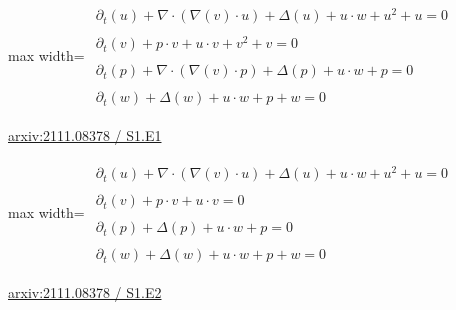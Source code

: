 \documentclass[10pt,a4paper]{article}
\begin{document}
\begin{minipage}{\linewidth}
\begin{center}\begin{adjustbox}{max width=\linewidth}$\displaystyle\begin{gathered}\begin{gathered}\partial_{t}(u)+\nabla\cdot(\nabla(v)\cdot u)+\Delta(u)+u\cdot w+u^{2}+u=0\end{gathered}\\[5pt]\begin{gathered}\partial_{t}(v)+p\cdot v+u\cdot v+v^{2}+v=0\end{gathered}\\[5pt]\begin{gathered}\partial_{t}(p)+\nabla\cdot(\nabla(v)\cdot p)+\Delta(p)+u\cdot w+p=0\end{gathered}\\[5pt]\begin{gathered}\partial_{t}(w)+\Delta(w)+u\cdot w+p+w=0\end{gathered}\end{gathered}$\end{adjustbox}\end{center}
{\small \href{https://arxiv.org/html/2111.08378#S1.E1}{arxiv:2111.08378 / S1.E1}}\par
\end{minipage}\par\vspace{7mm}

\begin{minipage}{\linewidth}
\begin{center}\begin{adjustbox}{max width=\linewidth}$\displaystyle\begin{gathered}\begin{gathered}\partial_{t}(u)+\nabla\cdot(\nabla(v)\cdot u)+\Delta(u)+u\cdot w+u^{2}+u=0\end{gathered}\\[5pt]\begin{gathered}\partial_{t}(v)+p\cdot v+u\cdot v=0\end{gathered}\\[5pt]\begin{gathered}\partial_{t}(p)+\Delta(p)+u\cdot w+p=0\end{gathered}\\[5pt]\begin{gathered}\partial_{t}(w)+\Delta(w)+u\cdot w+p+w=0\end{gathered}\end{gathered}$\end{adjustbox}\end{center}
{\small \href{https://arxiv.org/html/2111.08378#S1.E2}{arxiv:2111.08378 / S1.E2}}\par
\end{minipage}\par\vspace{7mm}
\end{document}
